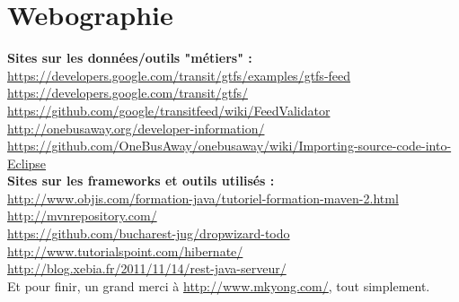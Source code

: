 \chapter*{Webographie}
\label{Bibliographie}


\textbf{Sites sur les données/outils "métiers" :}\label{OBA}\\


\url{https://developers.google.com/transit/gtfs/examples/gtfs-feed}\\

\url{https://developers.google.com/transit/gtfs/}\\

\url{https://github.com/google/transitfeed/wiki/FeedValidator}\\

\url{http://onebusaway.org/developer-information/}\\

\url{https://github.com/OneBusAway/onebusaway/wiki/Importing-source-code-into-Eclipse}\\


\textbf{Sites sur les frameworks et outils utilisés :}\\


\url{http://www.objis.com/formation-java/tutoriel-formation-maven-2.html}\\

\url{http://mvnrepository.com/}\\

\url{https://github.com/bucharest-jug/dropwizard-todo}\\

\url{http://www.tutorialspoint.com/hibernate/}\\

\url{http://blog.xebia.fr/2011/11/14/rest-java-serveur/}\\


Et pour finir, un grand merci à \url{http://www.mkyong.com/}, tout simplement.
